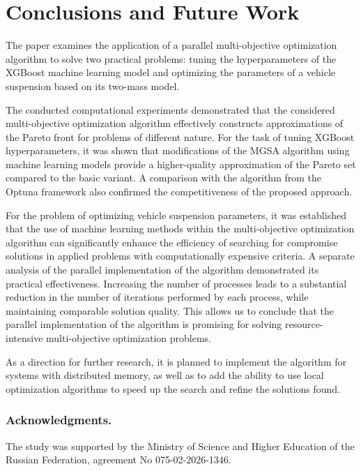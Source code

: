 \documentclass[a4paper]{llncs}
\begin{document}
\section{Conclusions and Future Work}
\label{sec5}

The paper examines the application of a parallel multi-objective optimization algorithm to solve two practical problems: tuning the hyperparameters of the XGBoost machine learning model and optimizing the parameters of a vehicle suspension based on its two-mass model.

The conducted computational experiments demonstrated that the considered multi-objective optimization algorithm effectively constructs approximations of the Pareto front for problems of different nature. For the task of tuning XGBoost hyperparameters, it was shown that modifications of the MGSA algorithm using machine learning models provide a higher-quality approximation of the Pareto set compared to the basic variant. A comparison with the algorithm from the Optuna framework also confirmed the competitiveness of the proposed approach.

For the problem of optimizing vehicle suspension parameters, it was established that the use of machine learning methods within the multi-objective optimization algorithm can significantly enhance the efficiency of searching for compromise solutions in applied problems with computationally expensive criteria. A separate analysis of the parallel implementation of the algorithm demonstrated its practical effectiveness. Increasing the number of processes leads to a substantial reduction in the number of iterations performed by each process, while maintaining comparable solution quality. This allows us to conclude that the parallel implementation of the algorithm is promising for solving resource-intensive multi-objective optimization problems.

As a direction for further research, it is planned to implement the algorithm for systems with distributed memory, as well as to add the ability to use local optimization algorithms to speed up the search and refine the solutions found.

\subsubsection*{Acknowledgments.}
The study was supported by the Ministry of Science and Higher Education of the Russian Federation, agreement No 075-02-2026-1346.


%
%
%


\end{document}
